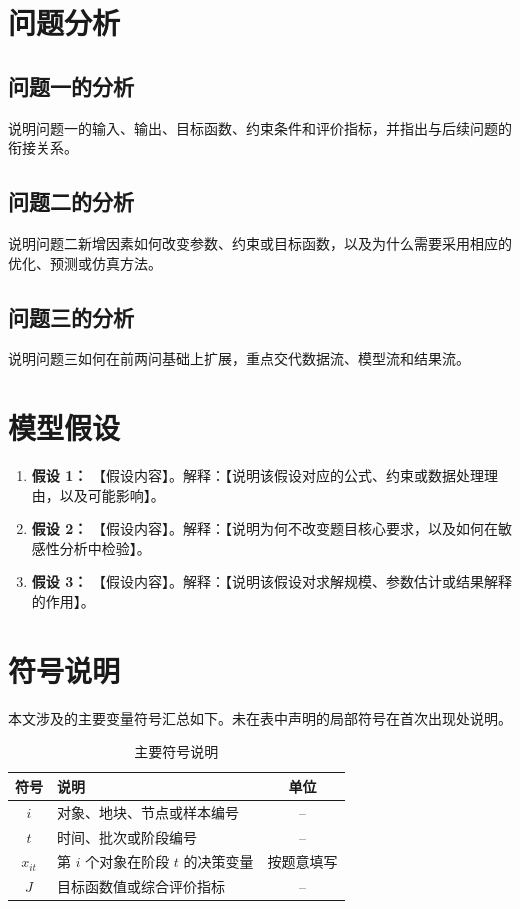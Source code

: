 \documentclass[UTF8,a4paper,zihao=-4]{ctexart}
\begin{document}
\section{问题分析}
\subsection{问题一的分析}
说明问题一的输入、输出、目标函数、约束条件和评价指标，并指出与后续问题的衔接关系。

\subsection{问题二的分析}
说明问题二新增因素如何改变参数、约束或目标函数，以及为什么需要采用相应的优化、预测或仿真方法。

\subsection{问题三的分析}
说明问题三如何在前两问基础上扩展，重点交代数据流、模型流和结果流。


\section{模型假设}
\begin{enumerate}
  \item \textbf{假设 1：} 【假设内容】。解释：【说明该假设对应的公式、约束或数据处理理由，以及可能影响】。
  \item \textbf{假设 2：} 【假设内容】。解释：【说明为何不改变题目核心要求，以及如何在敏感性分析中检验】。
  \item \textbf{假设 3：} 【假设内容】。解释：【说明该假设对求解规模、参数估计或结果解释的作用】。
\end{enumerate}

\section{符号说明}
本文涉及的主要变量符号汇总如下。未在表中声明的局部符号在首次出现处说明。
\begin{table}[H]
  \centering
  \caption{主要符号说明}
  \label{tab:symbols}
  \begin{tabularx}{\textwidth}{cXc}
    \toprule
    符号 & 说明 & 单位 \\
    \midrule
    $i$ & 对象、地块、节点或样本编号 & -- \\
    $t$ & 时间、批次或阶段编号 & -- \\
    $x_{it}$ & 第 $i$ 个对象在阶段 $t$ 的决策变量 & 按题意填写 \\
    $J$ & 目标函数值或综合评价指标 & -- \\
    \bottomrule
  \end{tabularx}
\end{table}
\end{document}
